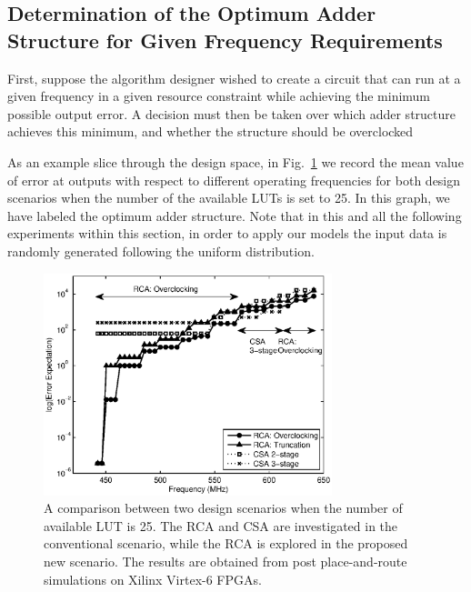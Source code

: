 \documentclass[prodmode,acmtrets]{acmsmall} %
\begin{document}
\subsection{Determination of the Optimum Adder Structure for Given Frequency Requirements}
First, suppose the algorithm designer wished to create a circuit that can run at a given frequency in a given resource constraint while achieving the minimum possible output error. A decision must then be taken over which adder structure achieves this minimum, and whether the structure should be overclocked



As an example slice through the design space, in Fig.~\ref{Fig_CSA_LUT25} we record the mean value of error at outputs with respect to different operating frequencies for both design scenarios when the number of the available LUTs is set to 25. In this graph, we have labeled the optimum adder structure. Note that in this and all the following experiments within this section, in order to apply our models the input data is randomly generated following the uniform distribution.
%
\begin{figure}[t]
  \centering
  \vspace{-2ex}
  \includegraphics[width=3.3in]{./Figures/Error_LUT25.eps}
  \vspace{-2ex}
  \caption{A comparison between two design scenarios when the number of available LUT is 25. The RCA and CSA are investigated in the conventional scenario, while the RCA is explored in the proposed new scenario. The results are obtained from post place-and-route simulations on Xilinx Virtex-6 FPGAs.}
  \vspace{-.5ex}
  \label{Fig_CSA_LUT25}
\end{figure}
\end{document}
